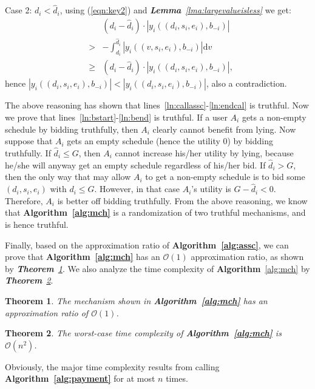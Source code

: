 \documentclass[10pt,journal,compsoc]{IEEEtran}
\newtheorem{theorem}{\textbf{Theorem}}
\begin{document}
\begin{IEEEproof}
    Case 2: $d_i<\hat{d}_i$, using (\ref{eqn:key2}) and \textit{\textbf{Lemma}~\ref{lma:largevalueisless}} we get:
\begin{eqnarray}
      &&(d_i- \hat{d}_i)\cdot |y_i((d_i,s_i,e_i),b_{-i})| \nonumber \\
      &>& -\int_{d_i}^{\hat{d}_i} |y_i((v,s_i,e_i),b_{-i})|\mathrm{d}v \nonumber\\
      &\geq& (d_i- \hat{d}_i)\cdot |y_i((d_i,s_i,e_i),b_{-i})|, \nonumber
    \end{eqnarray}
hence $|y_i((d_i,s_i,e_i),b_{-i})| <|y_i((d_i,s_i,e_i),b_{-i})|$, also a contradiction.

    The above reasoning has shown that lines~\ref{ln:callassc}-\ref{ln:endcal} is truthful. Now we prove that lines~\ref{ln:bstart}-\ref{ln:bend} is truthful. If a user $A_i$ gets a non-empty schedule by bidding truthfully, then $A_i$ clearly cannot benefit from lying. Now suppose that $A_i$ gets an empty schedule (hence the utility 0) by bidding truthfully. If $\hat{d}_i \leq G$, then $A_i$ cannot increase his/her utility by lying, because he/she will anyway get an empty schedule regardless of his/her bid. If $\hat{d}_i>G$, then the only way that may allow $A_i$ to get a non-empty schedule is to bid some $(d_i,s_i,e_i)$ with $d_i\leq G$. However, in that case $A_i$'s utility is $G-\hat{d}_i<0$. Therefore, $A_i$ is better off bidding truthfully. From the above reasoning, we know that \textbf{Algorithm~\ref{alg:mch}} is a randomization of two truthful mechanisms, and is hence truthful.
  \end{IEEEproof}

  Finally, based on the approximation ratio of \textbf{Algorithm~\ref{alg:assc}}, we can prove that \textbf{Algorithm~\ref{alg:mch}} has an $\mathcal{O}(1)$ approximation ratio, as shown by \textit{\textbf{Theorem}~\ref{thm:mchar}}. We also analyze the time complexity of \textbf{Algorithm}~\ref{alg:mch} by \textit{\textbf{Theorem}~\ref{thm:timcom}}.
\begin{theorem}
    The mechanism shown in \textbf{Algorithm~\ref{alg:mch}} has an approximation ratio of $\mathcal{O}(1)$.
    \label{thm:mchar}
  \end{theorem}
\begin{theorem}
    The worst-case time complexity of \textbf{Algorithm~\ref{alg:mch}} is $\mathcal{O}(n^2)$.
    \label{thm:timcom}
  \end{theorem}
Obviously, the major time complexity results from calling \textbf{Algorithm~\ref{alg:payment}} for at most $n$ times.
\end{document}
